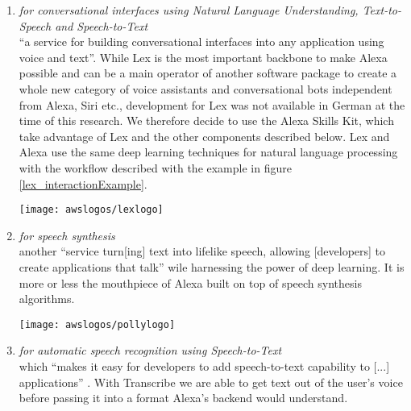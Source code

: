 \begin{enumerate}

	\item[\href{https://aws.amazon.com/lex/}{\textbf{Lex}} \footnote{\url{https://aws.amazon.com/lex}}] \textit{for conversational interfaces using Natural Language Understanding, Text-to-Speech and Speech-to-Text} \\
	``a service for building conversational interfaces into any application using voice and text''\cite{aws_website}.
	While Lex is the most important backbone to make Alexa possible and can be a main operator of another software package to create a whole new category of voice assistants and conversational bots independent from Alexa, Siri etc., development for Lex was not available in German at the time of this research. We therefore decide to use the Alexa Skills Kit, which take advantage of Lex and the other components described below. Lex and Alexa use the same deep learning techniques for natural language processing with the workflow described with the example in figure \ref{lex_interactionExample}.
	
	\begin{restoretext}
		\begin{flushright}
			\texttt{[image: awslogos/lexlogo]}
		\end{flushright}

	\end{restoretext}

	
	
	\item[\href{https://aws.amazon.com/polly/}{\textbf{Polly}} \footnote{\url{https://aws.amazon.com/polly}}] \textit{for speech synthesis\\}
	another ``service turn[ing] text into lifelike speech, allowing [developers] to create applications that talk'' \cite{aws_website} wile harnessing the power of deep learning. It is more or less the mouthpiece of Alexa built on top of speech synthesis algorithms.
	
	
	\begin{restoretext}
		\begin{flushright}
		\texttt{[image: awslogos/pollylogo]}
		\end{flushright}
	\end{restoretext}
	
	
	\item[\href{https://aws.amazon.com/transcribe/}{\textbf{Transcribe}} \footnote{\url{https://aws.amazon.com/transcribe}}] \textit{for automatic speech recognition using Speech-to-Text}\\
	which ``makes it easy for developers to add speech-to-text capability to [...] applications'' \cite{aws_website}. With Transcribe we are able to get text out of the user's voice before passing it into a format Alexa's backend would understand.
	

\end{enumerate}

